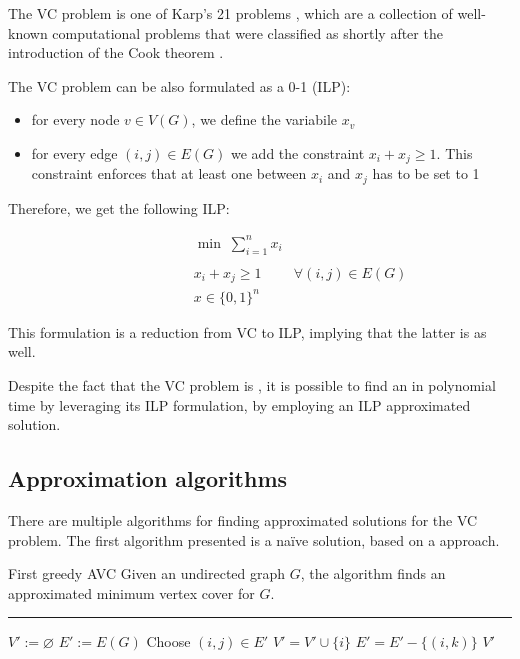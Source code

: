 \documentclass[a4paper, 12pt]{report}
\begin{document}
    The VC problem is one of Karp's 21 \NPComplete problems \cite{karp}, which are a collection of well-known computational problems that were classified as \NPComplete shortly after the introduction of the Cook theorem \cite{cook}.

    The VC problem can be also formulated as a 0-1  (ILP):
    \begin{itemize}
        \item for every node $v \in V(G)$, we define the variabile $x_v$
        \item for every edge $(i,j) \in E(G)$ we add the constraint $x_i + x_j \geq 1$. This constraint enforces that at least one between $x_i$ and $x_j$ has to be set to 1
    \end{itemize}

    Therefore, we get the following ILP:

    \[\begin{array}{ccc}
        \qquad\qquad\quad
        & \min \; \sum\limits_{i = 1}^n x_i \\\\
        & x_i + x_j \geq 1 & \forall (i,j) \in E(G) \\
        & x \in \{0,1\}^n
    \end{array}\]

    This formulation is a reduction from VC to ILP, implying that the latter is \NPComplete as well.

    Despite the fact that the VC problem is \NPComplete, it is possible to find an  in polynomial time by leveraging its ILP formulation, by employing an ILP approximated solution.

    \subsection{Approximation algorithms}

    There are multiple algorithms for finding approximated solutions for the VC problem. The first algorithm presented is a naïve solution, based on a  approach.

    \begin{framedalgo}[label={alg:first_greedy_avc}]{First greedy AVC}
        Given an undirected graph $G$, the algorithm finds an approximated minimum vertex cover for $G$. \\
        \hrule

        \quad
        \begin{algorithmic}[1]
                \State $V' := \varnothing$
                \State $E' := E(G)$
                    \State Choose $(i, j) \in E'$
                    \State $V' = V' \cup \{i\}$
                     
                        \State $E' = E' - \{(i, k)\}$
                    \EndFor
                \EndWhile
                \State {} $V'$
            \EndFunction
        \end{algorithmic}
    \end{framedalgo}
\end{document}
